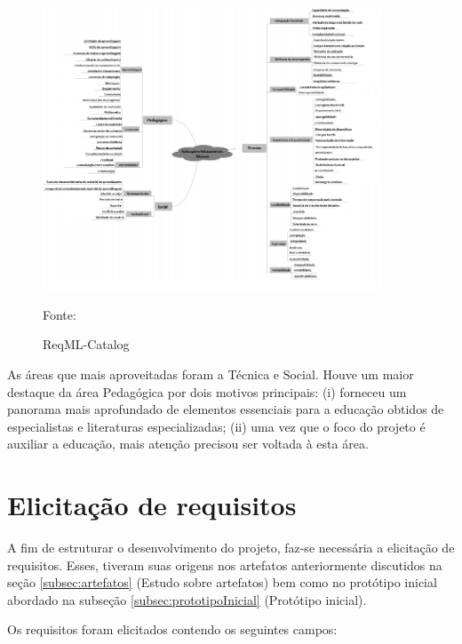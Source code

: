 \begin{figure}[H]
\centering
    \caption{ReqML-Catalog}
    \label{fig:reqML}
    \includegraphics[width=0.9\textwidth]{Figuras/reqML-catalog.png}
    
    Fonte: \cite{soad2017reqml}
\end{figure}

As áreas que mais aproveitadas foram a Técnica e Social. Houve um maior destaque da área Pedagógica por dois motivos principais: (i) forneceu um panorama mais aprofundado de elementos essenciais para a educação obtidos de especialistas e literaturas especializadas; (ii) uma vez que o foco do projeto é auxiliar a educação, mais atenção precisou ser voltada à esta área.

\section{Elicitação de requisitos}
A fim de estruturar o desenvolvimento do projeto, faz-se necessária a elicitação de requisitos. 
Esses, tiveram suas origens nos artefatos anteriormente discutidos na seção \ref{subsec:artefatos} (Estudo sobre artefatos) bem como no protótipo inicial abordado na subseção \ref{subsec:prototipoInicial} (Protótipo inicial).

Os requisitos foram elicitados contendo os seguintes campos:

